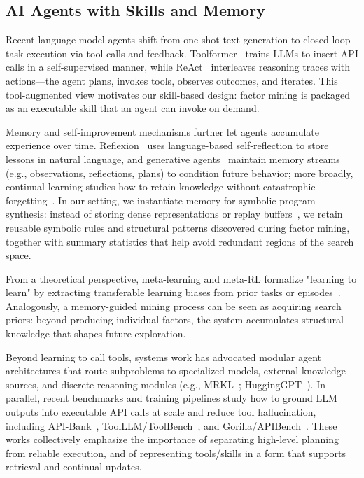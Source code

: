 \documentclass[sigconf]{acmart}
\begin{document}
\subsection{AI Agents with Skills and Memory}

Recent language-model agents shift from one-shot text generation to closed-loop task execution via tool calls and feedback. Toolformer~\citep{schick2023toolformer} trains LLMs to insert API calls in a self-supervised manner, while ReAct~\citep{yao2023react} interleaves reasoning traces with actions---the agent plans, invokes tools, observes outcomes, and iterates. This tool-augmented view motivates our skill-based design: factor mining is packaged as an executable skill that an agent can invoke on demand.

Memory and self-improvement mechanisms further let agents accumulate experience over time. Reflexion~\citep{shinn2023reflexion} uses language-based self-reflection to store lessons in natural language, and generative agents~\citep{park2023generativeagents} maintain memory streams (e.g., observations, reflections, plans) to condition future behavior; more broadly, continual learning studies how to retain knowledge without catastrophic forgetting~\citep{parisi2019continual}. In our setting, we instantiate memory for symbolic program synthesis: instead of storing dense representations or replay buffers~\citep{blundell2016model}, we retain reusable symbolic rules and structural patterns discovered during factor mining, together with summary statistics that help avoid redundant regions of the search space.

From a theoretical perspective, meta-learning and meta-RL formalize "learning to learn" by extracting transferable learning biases from prior tasks or episodes~\citep{finn2017maml,nichol2018reptile,gupta2018meta}. Analogously, a memory-guided mining process can be seen as acquiring search priors: beyond producing individual factors, the system accumulates structural knowledge that shapes future exploration.


Beyond learning to call tools, systems work has advocated modular agent architectures that route subproblems to specialized models, external knowledge sources, and discrete reasoning modules (e.g., MRKL~\citep{karpas2022mrkl}; HuggingGPT~\citep{shen2023hugginggpt}). In parallel, recent benchmarks and training pipelines study how to ground LLM outputs into executable API calls at scale and reduce tool hallucination, including API-Bank~\citep{li2023apibank}, ToolLLM/ToolBench~\citep{qin2023toollm}, and Gorilla/APIBench~\citep{patil2023gorilla}. These works collectively emphasize the importance of separating high-level planning from reliable execution, and of representing tools/skills in a form that supports retrieval and continual updates.
\end{document}
